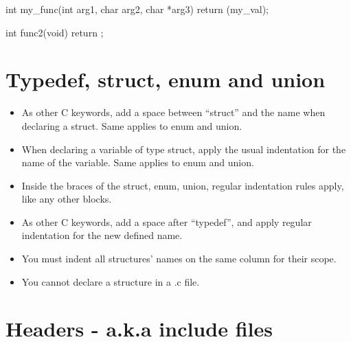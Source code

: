 \documentclass{42-en}
\begin{document}
            \begin{42ccode}
int my_func(int arg1, char arg2, char *arg3)
{
    return (my_val);
}

int func2(void)
{
    return ;
}
            \end{42ccode}

        \newpage


    \section{Typedef, struct, enum and union}

        \begin{itemize}

        \item As other C keywords, add a space between ``struct'' and the name
          when declaring a struct. Same applies to enum and union.

        \item When declaring a variable of type struct, apply the usual indentation for the name
          of the variable. Same applies to enum and union.

        \item Inside the braces of the struct, enum, union, regular indentation rules
          apply, like any other blocks.

        \item As other C keywords, add a space after ``typedef'',
          and apply regular indentation for the new defined name.

        \item You must indent all structures' names on the same column for their scope.

        \item You cannot declare a structure in a .c file.

        \end{itemize}
        \newpage


    \section{Headers - a.k.a include files}
\end{document}
